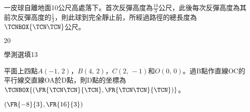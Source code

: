 \begin{QUESTIONS}
\begin{QUESTION}
        \begin{ExamAnsRateInfo}{}{}{}{}
        \end{ExamAnsRateInfo}
        \begin{QBODY}
            一皮球自離地面10公尺高處落下。首次反彈高度為$\frac{10}{3}$公尺，此後每次反彈高度為其前次反彈高度的$\frac{1}{3}$，則此球到完全靜止前，所經過路徑的總長度為$\TCNBOX{\TCN\TCN}$公尺。
        \end{QBODY}
        \begin{QFROMS}
        \end{QFROMS}
        \begin{QTAGS}\end{QTAGS}
        \begin{QANS}
            $20$
        \end{QANS}
        \begin{QSOLLIST}
        \end{QSOLLIST}
        \begin{QEMPTYSPACE}
        \end{QEMPTYSPACE}
    \end{QUESTION}
    \begin{QUESTION}
        \begin{ExamInfo}{83}{學測}{選填}{13}
        \end{ExamInfo}
        \begin{ExamAnsRateInfo}{}{}{}{}
        \end{ExamAnsRateInfo}
        \begin{QBODY}
            平面上四點$A\left( -1,\,2 \right)$，$B\left( 4,\,2 \right)$，$C\left( 2,\,-1 \right)$和$O\left( 0,\,0 \right)$。過B點作直線OC的平行線交直線OA於D點，則D點的坐標為 $\TCNBOX {(\FR{\TCN\TCN}{\TCN},\FR{\TCN\TCN}{\TCN})}$。
        \end{QBODY}
        \begin{QFROMS}
        \end{QFROMS}
        \begin{QTAGS}\end{QTAGS}
        \begin{QANS}
            $(\FR{-8}{3}, \FR{16}{3})$
        \end{QANS}
        \begin{QSOLLIST}
        \end{QSOLLIST}
        \begin{QEMPTYSPACE}
        \end{QEMPTYSPACE}
    \end{QUESTION}
    \begin{QUESTION}

\end{QUESTION}
\end{QUESTIONS}
